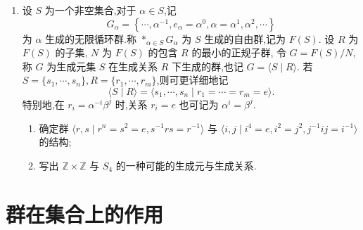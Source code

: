 \begin{enumerate}
\begin{proof}
\begin{enumerate}[label=(\arabic*)]
\end{enumerate}
\end{proof}
\item 设 $S$ 为一个非空集合,对于 $\alpha \in S$,记
\[G_{\alpha} = \left\{\cdots , \alpha^{-1}, e_{\alpha} = \alpha^{0}, \alpha = \alpha^{1}, \alpha^{2}, \cdots\right\}\]
为 $\alpha$ 生成的无限循环群.称 $*_{\alpha \in S} G_{\alpha}$ 为 $S$ 生成的自由群,记为 $F(S)$.
设 $R$ 为 $F(S)$ 的子集, $N$ 为 $F(S)$ 的包含 $R$ 的最小的正规子群,
令 $G = F(S)/N$,称 $G$ 为生成元集 $S$ 在生成关系 $R$ 下生成的群,也记 $G = \langle S \mid R \rangle$.
若 $S = \{s_1 , \cdots , s_n\}, R = \{r_1 , \cdots , r_m\}$,则可更详细地记
\[\langle S \mid R \rangle = \langle s_1 , \cdots , s_n \mid r_1 = \cdots = r_m = e \rangle.\]
特别地,在 $r_i = \alpha^{-i}\beta^{j}$ 时,关系 $r_i = e$ 也可记为 $\alpha^i = \beta^j$.
\begin{enumerate}[label=(\arabic*)]
\item 确定群 $\langle r,s \mid r^n = s^2 = e, s^{-1}rs = r^{-1} \rangle$ 与 $\langle i,j \mid i^4 = e, i^2 = j^2, j^{-1}ij = i^{-1} \rangle$的结构;

\item 写出 $\mathbb{Z} \times \mathbb{Z}$ 与 $S_4$ 的一种可能的生成元与生成关系.

\end{enumerate}
\end{enumerate}


\section{群在集合上的作用}

